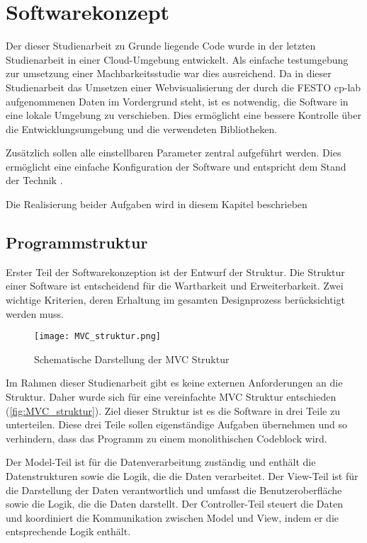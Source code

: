 \chapter{Softwarekonzept} \label{chap:Konzept}

Der dieser Studienarbeit zu Grunde liegende Code wurde in der letzten Studienarbeit in einer Cloud-Umgebung entwickelt. Als einfache testumgebung zur umsetzung einer Machbarkeitsstudie war dies ausreichend. 
Da in dieser Studienarbeit das Umsetzen einer Webvisualisierung der durch die FESTO \ac{cp-lab} aufgenommenen Daten im Vordergrund steht, ist es notwendig, die Software in eine lokale Umgebung zu verschieben. 
Dies ermöglicht eine bessere Kontrolle über die Entwicklungsumgebung und die verwendeten Bibliotheken. 

Zusätzlich sollen alle einstellbaren Parameter zentral aufgeführt werden. Dies ermöglicht eine einfache Konfiguration der Software und entspricht dem Stand der Technik\cite{gur_diskussion_2024} \cite{oliveira_how_2023}. 

Die Realisierung beider Aufgaben wird in diesem Kapitel beschrieben

\section{Programmstruktur} \label{sec:architektur}

Erster Teil der Softwarekonzeption ist der Entwurf der Struktur. Die Struktur einer Software ist entscheidend für die Wartbarkeit und Erweiterbarkeit. Zwei wichtige Kriterien, deren Erhaltung im gesamten Designprozess berücksichtigt werden muss.

\begin{figure}[H]
    \centering
    \texttt{[image: MVC\_struktur.png]}
    \caption{Schematische Darstellung der MVC Struktur \cite{noauthor_model_2024}} 
    \label{fig:MVC_struktur}
\end{figure}

Im Rahmen dieser Studienarbeit gibt es keine externen Anforderungen an die Struktur. Daher wurde sich für eine vereinfachte \ac{MVC} Struktur entschieden (\autoref{fig:MVC_struktur}). Ziel dieser Struktur ist es die Software in drei Teile zu unterteilen.
Diese drei Teile sollen eigenständige Aufgaben übernehmen und so verhindern, dass das Programm zu einem monolithischen Codeblock wird.

Der Model-Teil ist für die Datenverarbeitung zuständig und enthält die Datenstrukturen sowie die Logik, die die Daten verarbeitet. Der View-Teil ist für die Darstellung der Daten verantwortlich und umfasst die Benutzeroberfläche sowie die Logik, die die Daten darstellt. Der Controller-Teil steuert die Daten und koordiniert die Kommunikation zwischen Model und View, indem er die entsprechende Logik enthält.

